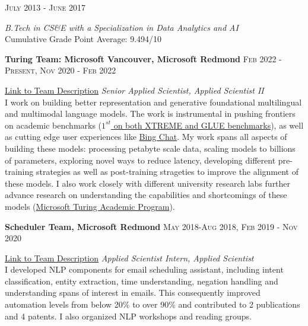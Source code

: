 \documentclass[8pt,a4paper]{article}
\begin{document}
  {\textsc{July 2013 - June 2017}} {%
  
    {
    \emph{B.Tech in CS\&E with a Specialization in Data Analytics and AI} \\
    Cumulative Grade Point Average: 9.494/10
    }
    
}
\spacedhrule{0.6em}{-0.4em}  %
\headedsection
  {\textbf{Turing Team: Microsoft Vancouver, Microsoft Redmond}}
  {\textsc{Feb 2022 - Present, Nov 2020 - Feb 2022}} {%
  
    {
    \href{https://turing.microsoft.com}{Link to Team Description}  \hfill \textit{Senior Applied Scientist, Applied Scientist II}  \\
    I work on building better representation and generative foundational multilingual and multimodal language models. The work is instrumental in pushing frontiers on academic benchmarks (\href{https://blogs.bing.com/search-quality-insights/october-2022/Microsoft-Turing-Universal-Language-Representation-model,-T-ULRv6,-tops-both-XTREME-and-GLUE-leaderb}{$1^{st}$ on both XTREME and GLUE benchmarks}), as well as cutting edge user experiences like \href{https://blogs.microsoft.com/blog/2023/02/07/reinventing-search-with-a-new-ai-powered-microsoft-bing-and-edge-your-copilot-for-the-web/}{Bing Chat}. My work spans all aspects of building these models: processing petabyte scale data, scaling models to billions of parameters, exploring novel ways to reduce latency, developing different pre-training strategies as well as post-training strageties to improve the alignment of these models. I also work closely with different university research labs further advance research on understanding the capabilities and shortcomings of these models (\href{https://www.microsoft.com/en-us/research/collaboration/microsoft-turing-academic-program/}{Microsoft Turing Academic Program}).
    
    }
}
\headedsection
  {\textbf{Scheduler Team, Microsoft Redmond}}
  {\textsc{May 2018-Aug 2018, Feb 2019 - Nov 2020}} {%

    {
      \href{https://www.microsoft.com/en-us/research/project/scheduler/}{Link to Team Description} \hfill \textit{Applied Scientist Intern, Applied Scientist} \\
      I developed NLP components for email scheduling assistant, including intent classification, entity extraction, time understanding, negation handling and understanding spans of interest in emails. This consequently improved automation levels from below 20\% to over 90\% and contributed to 2 publications and 4 patents. I also organized NLP workshops and reading groups.
    }
}
\end{document}
